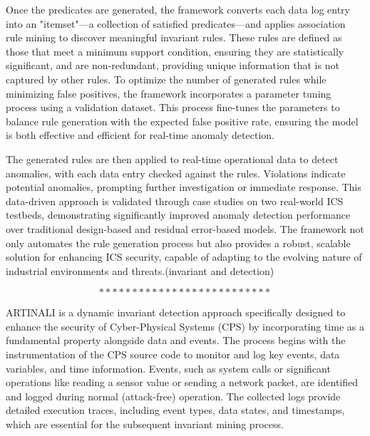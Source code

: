 Once the predicates are generated, the framework converts each data log entry into an "itemset"—a collection of satisfied predicates—and applies association rule mining to discover meaningful invariant rules. These rules are defined as those that meet a minimum support condition, ensuring they are statistically significant, and are non-redundant, providing unique information that is not captured by other rules. To optimize the number of generated rules while minimizing false positives, the framework incorporates a parameter tuning process using a validation dataset. This process fine-tunes the parameters to balance rule generation with the expected false positive rate, ensuring the model is both effective and efficient for real-time anomaly detection.

The generated rules are then applied to real-time operational data to detect anomalies, with each data entry checked against the rules. Violations indicate potential anomalies, prompting further investigation or immediate response. This data-driven approach is validated through case studies on two real-world ICS testbeds, demonstrating significantly improved anomaly detection performance over traditional design-based and residual error-based models. The framework not only automates the rule generation process but also provides a robust, scalable solution for enhancing ICS security, capable of adapting to the evolving nature of industrial environments and threats.\cite{21}(invariant and detection)

$$**************************$$

ARTINALI is a dynamic invariant detection approach specifically designed to enhance the security of Cyber-Physical Systems (CPS) by incorporating time as a fundamental property alongside data and events. The process begins with the instrumentation of the CPS source code to monitor and log key events, data variables, and time information. Events, such as system calls or significant operations like reading a sensor value or sending a network packet, are identified and logged during normal (attack-free) operation. The collected logs provide detailed execution traces, including event types, data states, and timestamps, which are essential for the subsequent invariant mining process.

